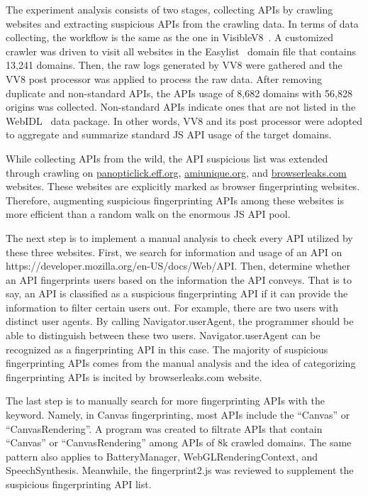 The experiment analysis consists of two stages, collecting APIs by crawling websites and extracting suspicious APIs from the crawling data. In terms of data collecting, the workflow is the same as the one in VisibleV8~\cite{vv8-imc19}. A customized crawler was driven to visit all websites in the Easylist~\cite{Easylist} domain file that contains 13,241 domains. Then, the raw logs generated by VV8 were gathered and the VV8 post processor was applied to process the raw data. After removing duplicate and non-standard APIs, the APIs usage of 8,682 domains with 56,828 origins was collected. Non-standard APIs indicate ones that are not listed in the WebIDL~\cite{webidl} data package. In other words, VV8 and its post processor were adopted to aggregate and summarize standard JS API usage of the target domains.

While collecting APIs from the wild, the API suspicious list was extended through crawling on \url{panopticlick.eff.org}, \url{amiunique.org}, and \url{browserleaks.com} websites. These websites are explicitly marked as browser fingerprinting websites. Therefore, augmenting suspicious fingerprinting APIs among these websites is more efficient than a random walk on the enormous JS API pool.

The next step is to implement a manual analysis to check every API utilized by these three websites. First, we search for information and usage of an API on https://developer.mozilla.org/en-US/docs/Web/API. Then, determine whether an API fingerprints users based on the information the API conveys. That is to say, an API is classified as a suspicious fingerprinting API if it can provide the information to filter certain users out. For example, there are two users with distinct user agents. By calling Navigator.userAgent, the programmer should be able to distinguish between these two users. Navigator.userAgent can be recognized as a fingerprinting API in this case. The majority of suspicious fingerprinting APIs comes from the manual analysis and the idea of categorizing fingerprinting APIs is incited by browserleaks.com website. 

The last step is to manually search for more fingerprinting APIs with the keyword. Namely, in Canvas fingerprinting, most APIs include the ``Canvas'' or ``CanvasRendering''. A program was created to filtrate APIs that contain ``Canvas'' or ``CanvasRendering'' among APIs of 8k crawled domains. The same pattern also applies to BatteryManager, WebGLRenderingContext, and SpeechSynthesis. Meanwhile, the fingerprint2.js was reviewed to supplement the suspicious fingerprinting API list.  

